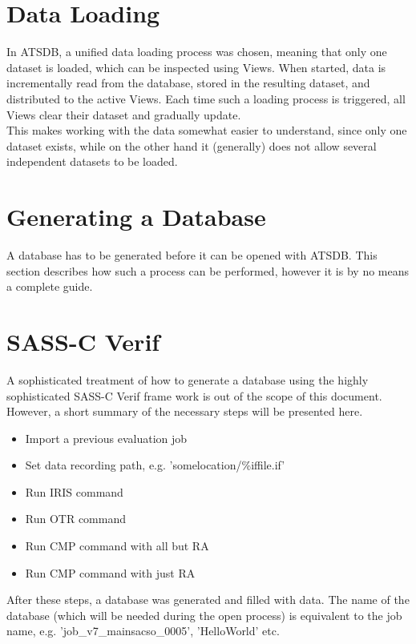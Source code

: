 \documentclass[10pt,letterpaper,extrafontsizes]{memoir}
\begin{document}
\section*{Data Loading}
In ATSDB, a unified data loading process was chosen, meaning that only one dataset is loaded, which can be inspected using Views. When started, data is incrementally read from the database, stored in the resulting dataset, and distributed to the active Views. Each time such a loading process is triggered, all Views clear their dataset and gradually update. \\
This makes working with the data somewhat easier to understand, since only one dataset exists, while on the other hand it (generally) does not allow several independent datasets to be loaded.

\section*{Generating a Database}
\label{sec:generation}

A database has to be generated before it can be opened with ATSDB.  This section describes how such
a process can be performed, however it is by no means a complete guide.

\section*{SASS-C Verif}
A sophisticated treatment of how to generate a database using the highly sophisticated SASS-C Verif frame work  is  out  of  the  scope  of  this  document.   However,  a  short  summary  of  the  necessary  steps  will  be presented here.\\

\begin{itemize}  
\item Import a previous evaluation job
\item Set data recording path, e.g. 'somelocation/\%iffile.if'
\item Run IRIS command
\item Run OTR command
\item Run CMP command with all but RA
\item Run CMP command with just RA
\end{itemize}

After  these  steps,  a  database  was  generated  and  filled  with  data.   The  name  of  the  database  (which
will  be  needed  during  the  open  process)  is  equivalent  to  the  job  name,  e.g.   'job\_v7\_mainsacso\_0005', 'HelloWorld' etc. \\
\end{document}
